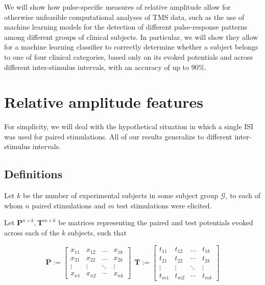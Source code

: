 \documentclass{article}
\begin{document}
\begin{multicols}{2}
We will show how pulse-specific measures of relative amplitude allow for
otherwise unfeasible computational analyses of TMS data, such as the use of
machine learning models for the detection of different pulse-response patterns
among different groups of clinical subjects. In particular, we will show they
allow for a machine learning classifier to correctly determine whether a
subject belongs to one of four clinical categories, based only on its evoked
potentials and across different inter-stimulus intervals, with an accuracy of up to
$90\%$.

\section{Relative amplitude features}

For simplicity, we will deal with the hypothetical situation
in which a single ISI was used for paired stimulations. All
of our results generalize to different inter-stimulus intervals.

\subsection{Definitions}

Let $k$ be the number of experimental subjects in some
subject group $\mathcal{G}$, to each of whom $n$ paired stimulations and
$m$ test stimulations were elicited.

\begin{definition}

Let $\textbf{P}^{n \times k}, \textbf{T}^{m\times k}$ be matrices representing
the paired and test potentials evoked across each of the $k$ subjects, such that  

\begin{equation*} \textbf{P} := \begin{bmatrix}x_{11} &
    x_{12}& \ldots & x_{1k} \\ x_{21} & x_{22}& \ldots &
    x_{2k} \\ \vdots & \vdots &\ddots& \vdots \\ x_{n1} & x_{n2}& \cdots & x_{nk}
\end{bmatrix} ~~ \textbf{T}:= \begin{bmatrix}t_{11} &
t_{12}& \ldots & t_{1k} \\ t_{21} & t_{22}& \cdots & t_{2k} \\
      \vdots & \vdots &\ddots& \vdots \\ t_{m1} & t_{m2}& \cdots & t_{mk}
\end{bmatrix} \end{equation*} \end{definition}


\end{multicols}
\end{document}
